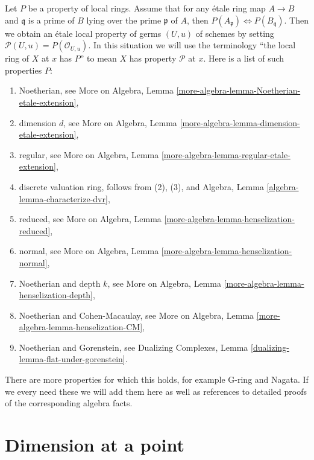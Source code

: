 \begin{remark}
\label{remark-list-properties-local-ring-local-etale-topology}
Let $P$ be a property of local rings. Assume that for any
\'etale ring map $A \to B$ and $\mathfrak q$ is a prime of $B$ lying over
the prime $\mathfrak p$ of $A$, then
$P(A_\mathfrak p) \Leftrightarrow P(B_\mathfrak q)$.
Then we obtain an \'etale local property of germs $(U, u)$ of schemes
by setting $\mathcal{P}(U, u) = P(\mathcal{O}_{U, u})$.
In this situation we will use the terminology
``the local ring of $X$ at $x$ has $P$'' to mean
$X$ has property $\mathcal{P}$ at $x$.
Here is a list of such properties $P$:
\begin{enumerate}
\item Noetherian, see
More on Algebra, Lemma \ref{more-algebra-lemma-Noetherian-etale-extension},
\item dimension $d$, see
More on Algebra, Lemma \ref{more-algebra-lemma-dimension-etale-extension},
\item regular, see
More on Algebra, Lemma \ref{more-algebra-lemma-regular-etale-extension},
\item discrete valuation ring, follows from (2), (3), and
Algebra, Lemma \ref{algebra-lemma-characterize-dvr},
\item reduced, see
More on Algebra, Lemma \ref{more-algebra-lemma-henselization-reduced},
\item normal, see
More on Algebra, Lemma \ref{more-algebra-lemma-henselization-normal},
\item Noetherian and depth $k$, see
More on Algebra, Lemma \ref{more-algebra-lemma-henselization-depth},
\item Noetherian and Cohen-Macaulay, see
More on Algebra, Lemma \ref{more-algebra-lemma-henselization-CM},
\item Noetherian and Gorenstein, see
Dualizing Complexes, Lemma \ref{dualizing-lemma-flat-under-gorenstein}.
\end{enumerate}
There are more properties for which this holds, for example G-ring and
Nagata. If we every need these we will add them here
as well as references to detailed proofs of the corresponding
algebra facts.
\end{remark}




\section{Dimension at a point}
\label{section-dimension}

